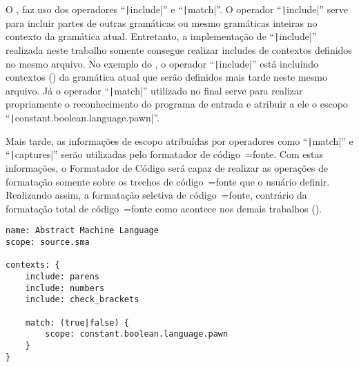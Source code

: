 O ,
faz uso dos operadores ``\texttt|include|'' e
``\texttt|match|''.
O operador ``\texttt|include|'' serve para incluir partes de outras gramáticas ou
mesmo gramáticas inteiras no contexto da gramática atual.
Entretanto,
a implementação de ``\texttt|include|'' realizada neste trabalho somente consegue realizar includes de contextos definidos no mesmo arquivo.
No exemplo do ,
o operador ``\texttt|include|'' está incluindo contextos () da gramática atual que serão definidos mais tarde neste mesmo arquivo.
Já o operador ``\texttt|match|'' utilizado no final serve para realizar propriamente o reconhecimento do programa de entrada e
atribuir a ele o escopo ``\texttt|constant.boolean.language.pawn|''.

Mais tarde,
as informações de escopo atribuídas por operadores como ``\texttt|match|'' e
``\texttt|captures|'' serão utilizadas pelo formatador de código~=fonte.
Com estas informações,
o Formatador de Código será capaz de realizar as operações de formatação somente sobre os trechos de código~=fonte que o usuário definir.
Realizando assim,
a formatação seletiva de código~=fonte,
contrário da formatação total de código~=fonte como acontece nos demais trabalhos ().
\begin{lstlisting}[caption={Exemplo de Gramática, Símbolo Inicial},label={code:exemploDeGramaticaPawn1},style=yaml_style]
name: Abstract Machine Language
scope: source.sma

contexts: {
    include: parens
    include: numbers
    include: check_brackets

    match: (true|false) {
        scope: constant.boolean.language.pawn
    }
}
\end{lstlisting}

